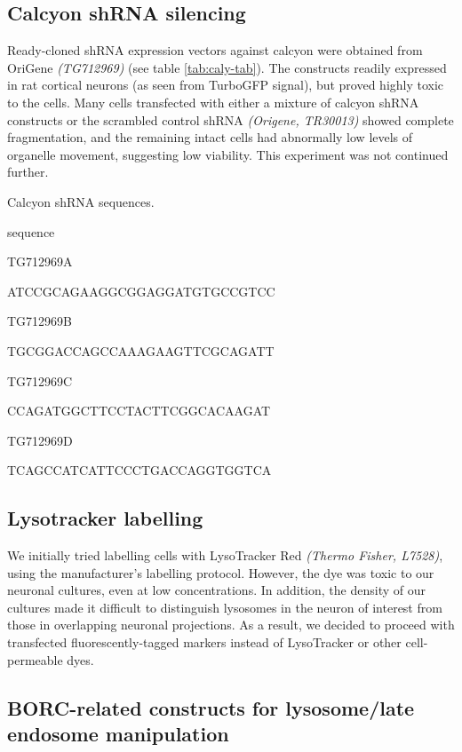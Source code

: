 \documentclass[
  12pt,
  a4paper,
]{book}
\begin{document}
\hypertarget{calcyon-shrna-silencing}{%
\subsection{Calcyon shRNA silencing}\label{calcyon-shrna-silencing}}

Ready-cloned shRNA expression vectors against calcyon were obtained from OriGene \emph{(TG712969)} (see table \ref{tab:caly-tab}). The constructs readily expressed in rat cortical neurons (as seen from TurboGFP signal), but proved highly toxic to the cells. Many cells transfected with either a mixture of calcyon shRNA constructs or the scrambled control shRNA \emph{(Origene, TR30013)} showed complete fragmentation, and the remaining intact cells had abnormally low levels of organelle movement, suggesting low viability. This experiment was not continued further.

\label{tab:caly-tab}Calcyon shRNA sequences.

sequence

TG712969A

ATCCGCAGAAGGCGGAGGATGTGCCGTCC

TG712969B

TGCGGACCAGCCAAAGAAGTTCGCAGATT

TG712969C

CCAGATGGCTTCCTACTTCGGCACAAGAT

TG712969D

TCAGCCATCATTCCCTGACCAGGTGGTCA

\hypertarget{lysotracker-labelling}{%
\subsection{Lysotracker labelling}\label{lysotracker-labelling}}

We initially tried labelling cells with LysoTracker Red \emph{(Thermo Fisher, L7528)}, using the manufacturer's labelling protocol. However, the dye was toxic to our neuronal cultures, even at low concentrations. In addition, the density of our cultures made it difficult to distinguish lysosomes in the neuron of interest from those in overlapping neuronal projections. As a result, we decided to proceed with transfected fluorescently-tagged markers instead of LysoTracker or other cell-permeable dyes.

\hypertarget{borc-related-constructs-for-lysosomelate-endosome-manipulation}{%
\subsection{BORC-related constructs for lysosome/late endosome manipulation}\label{borc-related-constructs-for-lysosomelate-endosome-manipulation}}
\end{document}
